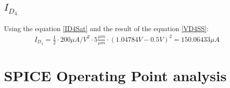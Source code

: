\documentclass[10pt,a4paper]{book}
\begin{document}
\subsection{$I_{D_4}$}
Using the equation \ref{ID4Sat} and the result of the equation \ref{VD4SS}:
\begin{align}
I_{D_4} = \frac{1}{2}\cdot 200 \mu A/V^2\cdot 5 \frac{\mu m}{\mu m} \cdot \left(1.04784V -0.5V \right)^2 = 150.06433 \mu A
\end{align}

\section{SPICE Operating Point analysis}


\end{document}
